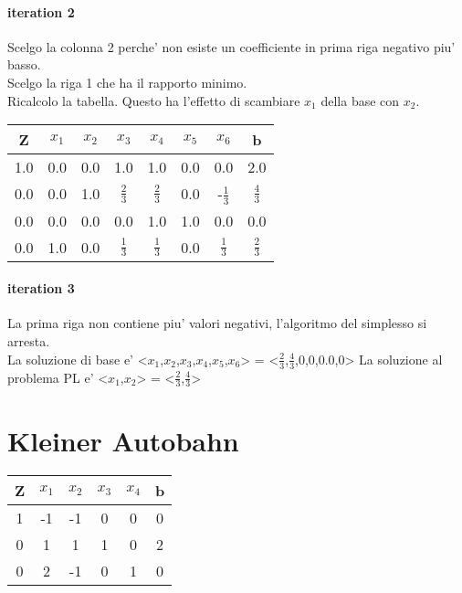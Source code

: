 \paragraph{iteration 2}
Scelgo la colonna 2 perche' non esiste un coefficiente in prima riga negativo piu' basso. \\
Scelgo la riga 1 che ha il rapporto minimo. \\
Ricalcolo la tabella.
Questo ha l'effetto di scambiare $x_1$ della base con $x_2$. \
\begin{center}
	\begin{tabular}{|c|c|c|c|c|c|c|c|}
		\hline
		Z & $x_1$ & $x_2$ & $x_3$ & $x_4$ & $x_5$ & $x_6$ & b\\
		\hline
		1.0 & 0.0 & 0.0 & 1.0 & 1.0 & 0.0 & 0.0 & 2.0\\
		0.0 & 0.0 & 1.0 & $\frac 2 3$ & $\frac 2 3$ & 0.0 & -$\frac 1 3$ & $\frac 4 3$\\
		0.0 & 0.0 & 0.0 & 0.0 & 1.0 & 1.0 & 0.0 & 0.0\\
		0.0 & 1.0 & 0.0 & $\frac 1 3$ & $\frac 1 3$ & 0.0 & $\frac 1 3$ & $\frac 2 3$\\
		\hline
	\end{tabular}
\end{center}
\paragraph{iteration 3}
La prima riga non contiene piu' valori negativi, l'algoritmo del simplesso si arresta. \\
La soluzione di base e' <$x_1$,$x_2$,$x_3$,$x_4$,$x_5$,$x_6$> = <$\frac 2 3$,$\frac 4 3$,0,0,0.0,0>\*
La soluzione al problema PL e' <$x_1$,$x_2$> = <$\frac 2 3$,$\frac 4 3$>\*
\section{Kleiner Autobahn}
\begin{center}
	\begin{tabular}{|c|c|c|c|c|c|}
		\hline
		Z & $x_1$ & $x_2$ & $x_3$ & $x_4$ & b\\
		\hline
		1 & -1 & -1 & 0 & 0 & 0\\
		0 & 1 & 1 & 1 & 0 & 2\\
		0 & 2 & -1 & 0 & 1 & 0\\
		\hline
	\end{tabular}
\end{center}
